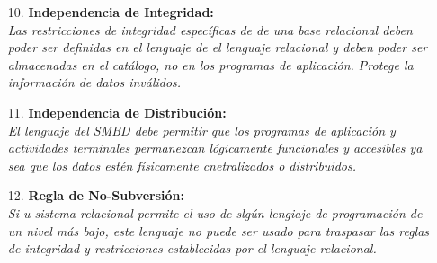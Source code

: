 \documentclass[a4paper, 12pt]{report}
\begin{document}
{\begin{enumerate}
{}
\item[10.]{\textbf{Independencia de Integridad:}\\\textit{
    Las restricciones de integridad específicas de de una base relacional deben
    poder ser definidas en el lenguaje de el lenguaje relacional y deben poder
    ser almacenadas en el catálogo, no en los programas de aplicación. Protege la
    información de datos inválidos.}\\
}
\item[11.]{\textbf{Independencia de Distribución:}\\\textit{
    El lenguaje del SMBD debe permitir que los programas de aplicación y actividades
    terminales permanezcan lógicamente funcionales y accesibles ya sea que los datos
    estén físicamente cnetralizados o distribuidos.}\\
}
\item[12.]{\textbf{Regla de No-Subversión:}\\\textit{
    Si u sistema relacional permite el uso de slgún lengiaje de programación de
    un nivel más bajo, este lenguaje no puede ser usado para traspasar las reglas
    de integridad y restricciones establecidas por el lenguaje relacional.}\\
}
\end{enumerate}
}
\end{document}
